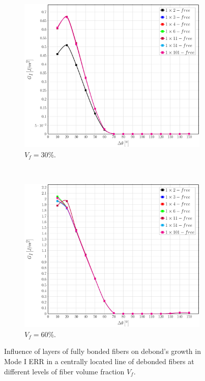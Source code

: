 \documentclass[review]{elsarticle}
\begin{document}
\begin{figure}[!h]
\centering
    \begin{subfigure}[b]{0.45\textwidth}
        \includegraphics[width=\textwidth]{abovefibers-vf30-GI.pdf}
        \caption{$V_{f}=30\%$.}\label{subfig:abovefiber30MI}
    \end{subfigure} ~
    \begin{subfigure}[b]{0.45\textwidth}
        \includegraphics[width=\textwidth]{abovefibers-vf60-GI.pdf}
        \caption{$V_{f}=60\%$.}\label{subfig:abovefiber60MI}
    \end{subfigure}

\caption{Influence of layers of fully bonded fibers on debond's growth in Mode I ERR in a centrally located line of debonded fibers at different levels of fiber volume fraction $V_{f}$.}\label{fig:abovefibersMI}
\end{figure}
\end{document}
